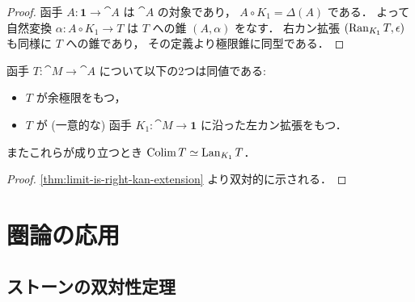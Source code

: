 \documentclass[titlepage]{ltjsreport}
\newtheorem[S]{theorem}{定理}[chapter]
\newtheorem[S]{definition}[theorem]{定義}
\newtheorem[S]{example}[theorem]{例}
\begin{document}
\begin{proof}
  函手 $A:\mathbf{1}\to\cat{A}$ は $\cat{A}$ の対象であり，
  $A\circ K_1=\Delta(A)$ である．
  よって自然変換 $\alpha:A\circ K_1\to T$ は $T$ への錐 $(A,\alpha)$ をなす．
  右カン拡張 $(\operatorname{Ran}_{K_1}T,\epsilon)$ も同様に $T$ への錐であり，
  その定義より極限錐に同型である．
\end{proof}

\begin{center}
  \begin{minipage}[b]{0.4\linewidth}
    
  \end{minipage}
  \begin{minipage}[b]{0.4\linewidth}
    
  \end{minipage}
\end{center}

\begin{theorem}[余極限は左カン拡張である]
  函手 $T:\cat{M}\to\cat{A}$ について以下の2つは同値である:
  \begin{itemize}
    \item $T$ が余極限をもつ，
    \item $T$ が (一意的な) 函手 $K_1:\cat{M}\to\mathbf{1}$
          に沿った左カン拡張をもつ．
  \end{itemize}
  またこれらが成り立つとき $\operatorname{Colim} T\simeq\operatorname{Lan}_{K_1}T$．
\end{theorem}

\begin{proof}
  \cref{thm:limit-is-right-kan-extension} より双対的に示される．
\end{proof}

\begin{center}
  \begin{minipage}[b]{0.4\linewidth}
    
  \end{minipage}
  \begin{minipage}[b]{0.4\linewidth}
    
  \end{minipage}
\end{center}

\chapter{圏論の応用}

\section{ストーンの双対性定理}
\end{document}
